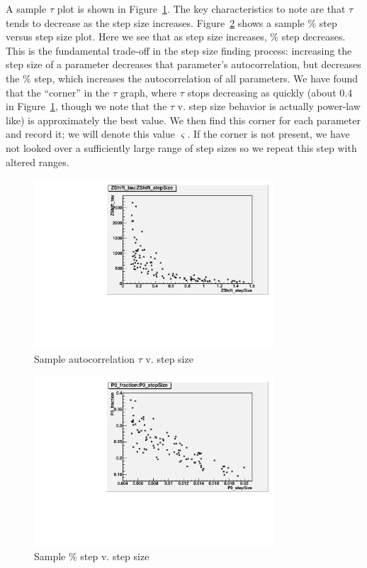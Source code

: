 A sample $\tau$ plot is shown in \mbox{Figure \ref{SampleTau}}.  The
key characteristics to note are that $\tau$ tends to decrease as the
step size increases.  \mbox{Figure \ref{SampleFraction}} shows a
sample \% step versus step size plot.  Here we see that as step size
increases, \% step decreases.  This is the fundamental trade-off in
the step size finding process: increasing the step size of a parameter
decreases that parameter's autocorrelation, but decreases the \% step,
which increases the autocorrelation of all parameters.  We have found
that the ``corner'' in the $\tau$ graph, where $\tau$ stops decreasing
as quickly (about 0.4 in \mbox{Figure \ref{SampleTau}}, though we note
that the $\tau$ v. step size behavior is actually power-law like) is
approximately the best value.  We then find this corner for each
parameter and record it; we will denote this value $\varsigma$.  If
the corner is not present, we have not looked over a sufficiently
large range of step sizes so we repeat this step with altered ranges.

\begin{figure}
\centering
\includegraphics[width=0.8\textwidth]{Figures/MCMC/stepSizeLargeRangeTau}
\caption{Sample autocorrelation $\tau$ v. step size
\label{SampleTau}}
\end{figure}

\begin{figure}
\centering
\includegraphics[width=0.8\textwidth]{Figures/MCMC/P0FractionVStep}
\caption{Sample \% step v. step size
\label{SampleFraction}}
\end{figure}

